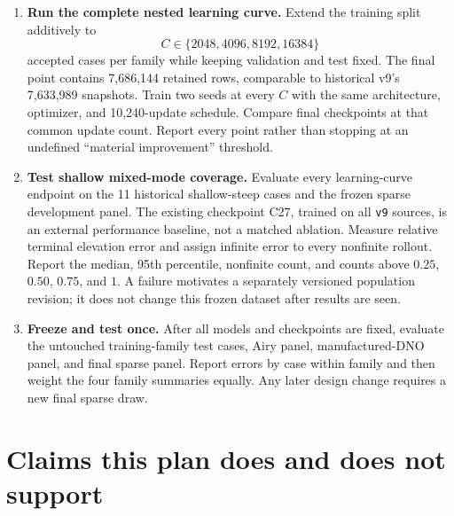 \documentclass[11pt]{article}
\begin{document}
\begin{enumerate}
  \item \textbf{Run the complete nested learning curve.}
        Extend the training split additively to
        \[
          C\in\{2048,4096,8192,16384\}
        \]
        accepted cases per family while keeping validation and test fixed.
        The final point contains 7,686,144 retained rows, comparable to
        historical v9's 7,633,989 snapshots.
        Train two seeds at every $C$ with the same architecture, optimizer,
        and 10,240-update schedule.  Compare final checkpoints at that common
        update count.  Report every point rather than stopping at an undefined
        ``material improvement'' threshold.

  \item \textbf{Test shallow mixed-mode coverage.}
        Evaluate every learning-curve endpoint on the 11 historical
        shallow-steep cases and the frozen sparse development panel.  The
        existing checkpoint C27, trained on all \texttt{v9} sources, is an
        external performance baseline, not a matched ablation.  Measure
        relative terminal elevation error and assign infinite error to every
        nonfinite rollout.  Report the median, 95th percentile, nonfinite
        count, and counts above $0.25$, $0.50$, $0.75$, and $1$.  A failure
        motivates a separately versioned population revision; it does not
        change this frozen dataset after results are seen.

  \item \textbf{Freeze and test once.}
        After all models and checkpoints are fixed, evaluate the untouched
        training-family test cases, Airy panel, manufactured-DNO panel, and
        final sparse panel.  Report errors by case within family and then
        weight the four family summaries equally.  Any later design change
        requires a new final sparse draw.
\end{enumerate}

\section{Claims this plan does and does not support}
\end{document}
